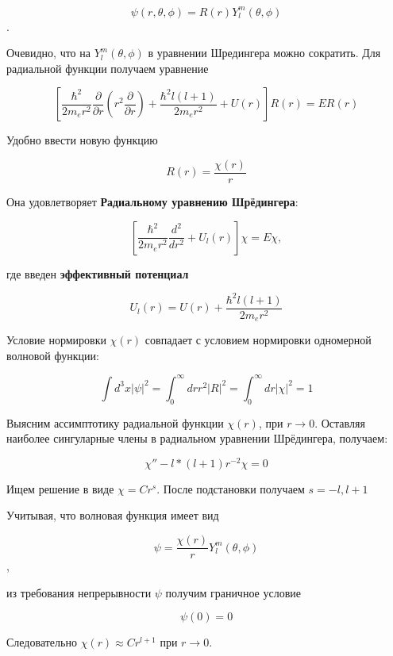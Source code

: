 $$\psi (r, \theta, \phi) = R(r) Y_l^m (\theta, \phi)$$.

Очевидно, что на $ Y_l^m (\theta, \phi)$ в уравнении Шредингера можно сократить. Для радиальной функции получаем уравнение

$$ \left[ \frac{\hbar ^ 2}{2 m_e r^2} \frac{\partial}{\partial r} \left (r^2 \frac{\partial}{\partial r}
\right) + \frac{\hbar ^ 2 l (l + 1)}{2 m_e r^2} + U(r) \right] R(r) = E R(r)$$

Удобно ввести новую функцию

$$R(r) = \frac{\chi (r)}{r}$$

Она удовлетворяет {\bf Радиальному уравнению Шрёдингера}:

$$ \left[ \frac{\hbar ^ 2}{2 m_e r^2} \frac{d^2}{d r^2} + U_l(r) \right] \chi = E \chi,$$

где введен {\bf эффективный потенциал}

$$U_l(r) = U(r) + \frac{\hbar^2 l (l + 1)}{2 m_e r^2}$$

Условие нормировки $\chi (r)$ совпадает с условием нормировки одномерной волновой функции:

$$\int d^3 x |\psi|^2 = \int_0^\infty drr^2|R|^2 = \int_0^\infty dr |\chi|^2 = 1$$

Выясним ассимптотику радиальной функции $\chi (r)$, при $r \rightarrow 0$.
Оставляя наиболее сингуларные члены в радиальном уравнении Шрёдингера, получаем:

$$ \chi'' - l * (l + 1) r^{-2} \chi = 0 $$

Ищем решение в виде $\chi = Cr^s$.
После подстановки получаем $s = -l, l+1$

Учитывая, что волновая функция имеет вид

$$\psi = \frac{\chi (r)}{r} Y_l^m (\theta, \phi)$$,

из требования непрерывности $\psi$ получим граничное условие

$$\psi (0) = 0$$

Следовательно $\chi (r) \approx Cr^{l+1}$ при $r \rightarrow 0$.